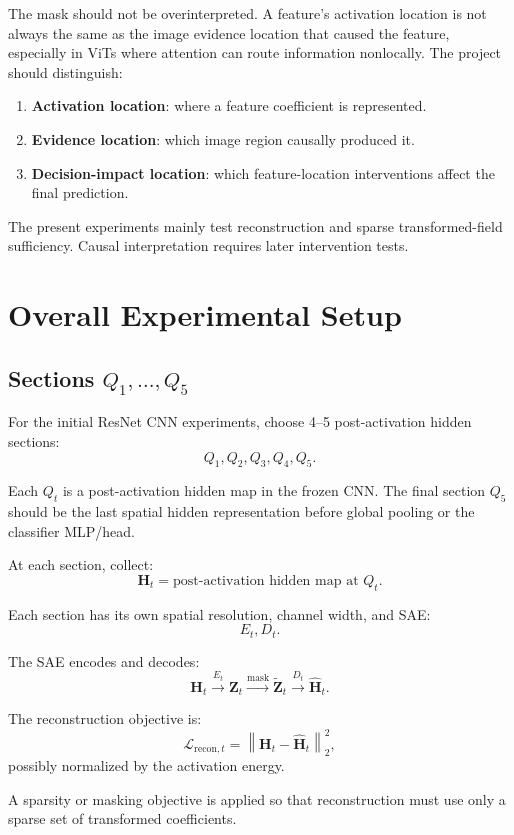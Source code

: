 \documentclass[11pt]{article}
\newcommand{\Htens}{\mathbf{H}}
\newcommand{\Ztens}{\mathbf{Z}}
\newcommand{\Hhat}{\widehat{\mathbf{H}}}
\newcommand{\Ztilde}{\widetilde{\mathbf{Z}}}
\begin{document}
The mask should not be overinterpreted. A feature's activation location is not always the same as the image evidence location that caused the feature, especially in ViTs where attention can route information nonlocally. The project should distinguish:

\begin{enumerate}[leftmargin=*]
    \item \textbf{Activation location}: where a feature coefficient is represented.
    \item \textbf{Evidence location}: which image region causally produced it.
    \item \textbf{Decision-impact location}: which feature-location interventions affect the final prediction.
\end{enumerate}

The present experiments mainly test reconstruction and sparse transformed-field sufficiency. Causal interpretation requires later intervention tests.

\section{Overall Experimental Setup}

\subsection{Sections \(Q_1,\ldots,Q_5\)}

For the initial ResNet CNN experiments, choose 4--5 post-activation hidden sections:
\[
Q_1, Q_2, Q_3, Q_4, Q_5.
\]

Each \(Q_t\) is a post-activation hidden map in the frozen CNN. The final section \(Q_5\) should be the last spatial hidden representation before global pooling or the classifier MLP/head.

At each section, collect:
\[
\Htens_t = \text{post-activation hidden map at } Q_t.
\]

Each section has its own spatial resolution, channel width, and SAE:
\[
E_t, D_t.
\]

The SAE encodes and decodes:
\[
\Htens_t
\stackrel{E_t}{\longrightarrow}
\Ztens_t
\stackrel{\text{mask}}{\longrightarrow}
\Ztilde_t
\stackrel{D_t}{\longrightarrow}
\Hhat_t.
\]

The reconstruction objective is:
\[
\mathcal{L}_{\text{recon},t}
=
\left\|\Htens_t - \Hhat_t\right\|_2^2,
\]
possibly normalized by the activation energy.

A sparsity or masking objective is applied so that reconstruction must use only a sparse set of transformed coefficients.
\end{document}
